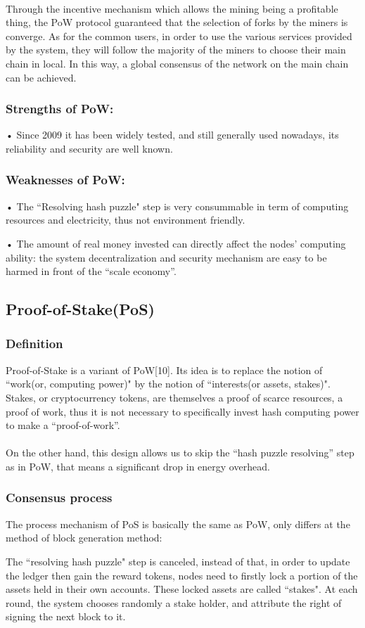\documentclass[]{article}
\begin{document}
\begin{CJK*}{UTF8}{gbsn}
    \paragraph{}
    Through the incentive mechanism which allows the mining being a profitable thing, the PoW protocol guaranteed that the selection of forks by the miners is converge. As for the common users, in order to use the various services provided by the system, they will follow the majority of the miners to choose their main chain in local. In this way, a global consensus of the network on the main chain can be achieved.
    \subsubsection*{Strengths of PoW:}
   • Since 2009 it has been widely tested, and still generally used nowadays, its reliability and security are well known.
	\subsubsection*{Weaknesses of PoW:}
    • The ``Resolving hash puzzle" step is very consummable in term of computing resources and electricity, thus not environment friendly.
\par • The amount of real money invested can directly affect the nodes’ computing ability: the system decentralization and security mechanism are easy to be harmed in front of the “scale economy”. 

	\subsection{Proof-of-Stake(PoS)} 
	\subsubsection*{Definition}
	Proof-of-Stake is a variant of PoW[10]. Its idea is to replace the notion of ``work(or, computing power)" by the notion of ``interests(or assets, stakes)". Stakes, or cryptocurrency tokens, are themselves a proof of scarce resources, a proof of work, thus it is not necessary to specifically invest hash computing power to make a ``proof-of-work''. 
	\paragraph{}
	On the other hand, this design allows us to skip the ``hash puzzle resolving'' step as in PoW, that means a significant drop in energy overhead.
	\subsubsection*{Consensus process}
	The process mechanism of PoS is basically the same as PoW, only differs at the method of block generation method: 
	\par The ``resolving hash puzzle" step is canceled, instead of that, in order to update the ledger then gain the reward tokens, nodes need to firstly lock a portion of the assets held in their own accounts. These locked assets are called ``stakes". At each round, the system chooses randomly a stake holder, and attribute the right of signing the next block to it. 

\end{CJK*}
\end{document}
